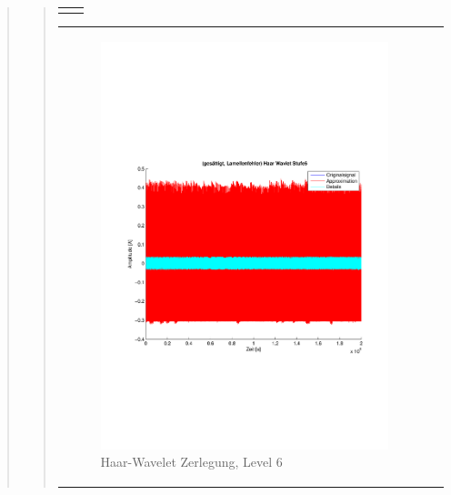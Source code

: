 \begin{quote}
\begin{quote}
\begin{center}
\begin{tabular}{ll}
\begin{minipage}{0.6\textwidth}
                    \end{minipage}
    
                \end{tabular}
                \end{center}
                
                
                
          \begin{center}
                \begin{tabular}{ll}
    
                \hspace{-8em}
                    \begin{minipage}{0.6\textwidth}
    
                        \begin{figure}[H]
                            \label{fig:}
                            \includegraphics[scale=0.4, trim = 2cm 6cm 1cm
                            7.5cm,
                            clip]{./Bilder/Termin8/lamellenfehler_gesaettigt_Haar_Wavlet_lvl_6}
                            \caption{Haar-Wavelet Zerlegung, Level 6}
                        \end{figure}
    

\end{minipage}
\end{tabular}
\end{center}
\end{quote}
\end{quote}
